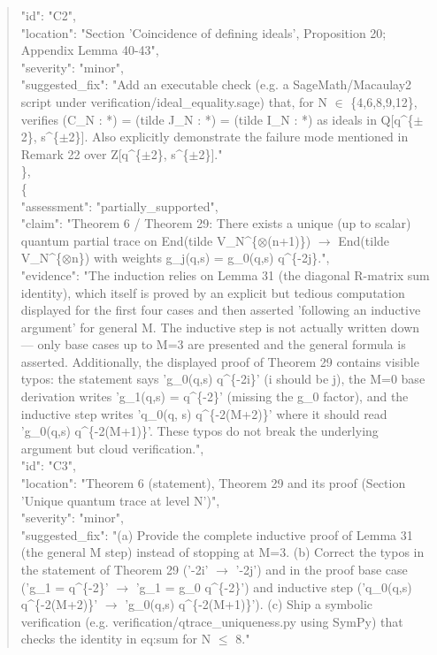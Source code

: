 \documentclass[11pt]{article}
\begin{document}
\begin{quote}
      "id": "C2",\\
      "location": "Section 'Coincidence of defining ideals', Proposition 20; Appendix Lemma 40-43",\\
      "severity": "minor",\\
      "suggested\_fix": "Add an executable check (e.g. a SageMath/Macaulay2 script under verification/ideal\_equality.sage) that, for N \ensuremath{\in} \{4,6,8,9,12\}, verifies (C\_N : *) = (tilde J\_N : *) = (tilde I\_N : *) as ideals in Q[q\^{}\{\ensuremath{\pm}2\}, s\^{}\{\ensuremath{\pm}2\}]. Also explicitly demonstrate the failure mode mentioned in Remark 22 over Z[q\^{}\{\ensuremath{\pm}2\}, s\^{}\{\ensuremath{\pm}2\}]."\\
    \},\\
    \{\\
      "assessment": "partially\_supported",\\
      "claim": "Theorem 6 / Theorem 29: There exists a unique (up to scalar) quantum partial trace on End(tilde V\_N\^{}\{\ensuremath{\otimes}(n+1)\}) \ensuremath{\to} End(tilde V\_N\^{}\{\ensuremath{\otimes}n\}) with weights g\_j(q,s) = g\_0(q,s) q\^{}\{-2j\}.",\\
      "evidence": "The induction relies on Lemma 31 (the diagonal R-matrix sum identity), which itself is proved by an explicit but tedious computation displayed for the first four cases and then asserted 'following an inductive argument' for general M. The inductive step is not actually written down --- only base cases up to M=3 are presented and the general formula is asserted. Additionally, the displayed proof of Theorem 29 contains visible typos: the statement says 'g\_0(q,s) q\^{}\{-2i\}' (i should be j), the M=0 base derivation writes 'g\_1(q,s) = q\^{}\{-2\}' (missing the g\_0 factor), and the inductive step writes 'q\_0(q, s) q\^{}\{-2(M+2)\}' where it should read 'g\_0(q,s) q\^{}\{-2(M+1)\}'. These typos do not break the underlying argument but cloud verification.",\\
      "id": "C3",\\
      "location": "Theorem 6 (statement), Theorem 29 and its proof (Section 'Unique quantum trace at level N')",\\
      "severity": "minor",\\
      "suggested\_fix": "(a) Provide the complete inductive proof of Lemma 31 (the general M step) instead of stopping at M=3. (b) Correct the typos in the statement of Theorem 29 ('-2i' \ensuremath{\to} '-2j') and in the proof base case ('g\_1 = q\^{}\{-2\}' \ensuremath{\to} 'g\_1 = g\_0 q\^{}\{-2\}') and inductive step ('q\_0(q,s) q\^{}\{-2(M+2)\}' \ensuremath{\to} 'g\_0(q,s) q\^{}\{-2(M+1)\}'). (c) Ship a symbolic verification (e.g. verification/qtrace\_uniqueness.py using SymPy) that checks the identity in eq:sum for N \ensuremath{\le} 8."\\

\end{quote}
\end{document}

